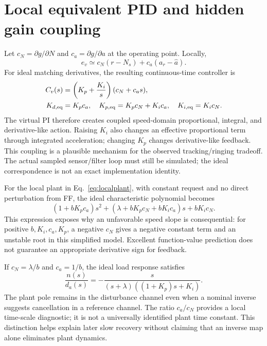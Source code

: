 \documentclass[11pt,a4paper,oneside]{report}
\begin{document}
\section{Local equivalent PID and hidden gain coupling}
Let $c_N=\partial g/\partial N$ and $c_a=\partial g/\partial a$ at the operating point. Locally,
\begin{equation}
e_v\simeq c_N(r-N_s)+c_a(a_r-\hat a).
\end{equation}
For ideal matching derivatives, the resulting continuous-time controller is
\begin{align}
C_v(s)&=\left(K_p+\frac{K_i}{s}\right)(c_N+c_as),\\
K_{d,\rm eq}&=K_pc_a,\quad
K_{p,\rm eq}=K_pc_N+K_ic_a,\quad
K_{i,\rm eq}=K_ic_N.
\label{eq:equivalent}
\end{align}
The virtual PI therefore creates coupled speed-domain proportional, integral, and derivative-like action. Raising $K_i$ also changes an effective proportional term through integrated acceleration; changing $K_p$ changes derivative-like feedback. This coupling is a plausible mechanism for the observed tracking/ringing tradeoff. The actual sampled sensor/filter loop must still be simulated; the ideal correspondence is not an exact implementation identity.

For the local plant in Eq.~\eqref{eq:localplant}, with constant request and no direct perturbation from FF, the ideal characteristic polynomial becomes
\begin{equation}
(1+bK_pc_a)s^2+(\lambda+bK_pc_N+bK_ic_a)s+bK_ic_N.
\label{eq:char}
\end{equation}
This expression exposes why an unfavorable speed slope is consequential: for positive $b,K_i,c_a,K_p$, a negative $c_N$ gives a negative constant term and an unstable root in this simplified model. Excellent function-value prediction does not guarantee an appropriate derivative sign for feedback.

If $c_N=\lambda/b$ and $c_a=1/b$, the ideal load response satisfies
\begin{equation}
\frac{n(s)}{d_a(s)}=-\frac{s}{(s+\lambda)((1+K_p)s+K_i)}.
\end{equation}
The plant pole remains in the disturbance channel even when a nominal inverse suggests cancellation in a reference channel. The ratio $c_a/c_N$ provides a local time-scale diagnostic; it is not a universally identified plant time constant. This distinction helps explain later slow recovery without claiming that an inverse map alone eliminates plant dynamics.
\end{document}
